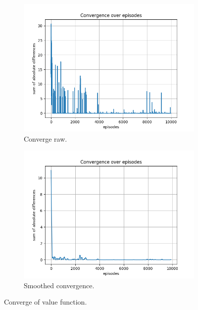 \documentclass{assignment}
\begin{document}
\begin{figure}[H]
    \begin{subfigure}{0.5\textwidth}
        \includegraphics[width=\textwidth]{figures/convergence_td/gamma_sweep/convergence_TD_alpha_0.1_gamma_0.75_epislon_0.2.png}
    \caption{Converge raw.}
    \end{subfigure}\hfill
    \begin{subfigure}{0.5\textwidth}
        \includegraphics[width=\textwidth]{figures/convergence_td/gamma_sweep/convergence_TD_smoothed_alpha_0.1_gamma_0.75_epislon_0.2.png}
    \caption{Smoothed convergence.}
    \end{subfigure}
    \caption{Converge of value function.}
    \label{fig:gamma_0.75_td_learning_convergence}
\end{figure}
\end{document}
